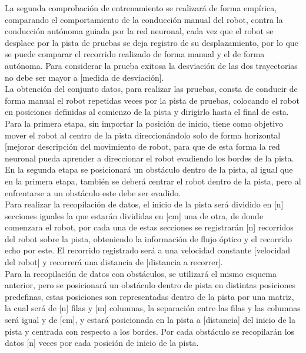 \documentclass{iccmemoria}
\begin{document}
La segunda comprobación de entrenamiento se realizará de forma empírica, comparando el comportamiento de la conducción manual del robot, contra la conducción autónoma guiada por la red neuronal, cada vez que el robot se desplace por la pista de pruebas se deja registro de su desplazamiento, por lo que se puede comparar el recorrido realizado de forma manual y el de forma autónoma. Para considerar la prueba exitosa la desviación de las dos trayectorias no debe ser mayor a [medida de desviación].\\

La obtención del conjunto datos, para realizar las pruebas, consta de conducir de forma manual el robot repetidas veces por la pista de pruebas, colocando el robot en posiciones definidas al comienzo de la pista y dirigirlo hasta el final de esta.\\

Para la primera etapa, sin importar la posición de inicio, tiene como objetivo mover el robot al centro de la pista direccionándolo solo de forma horizontal [mejorar descripción del movimiento de robot, para que de esta forma la red neuronal pueda aprender a direccionar el robot evadiendo los bordes de la pista.\\

En la segunda etapa se posicionará un obstáculo dentro de la pista, al igual que en la primera etapa, también se deberá centrar el robot dentro de la pista, pero al enfrentarse a un obstáculo este debe ser evadido.\\

Para realizar la recopilación de datos, el inicio de la pista será dividido en [n] secciones iguales la que estarán divididas en [cm] una de otra, de donde comenzara el robot, por cada una de estas secciones se registrarán [n] recorridos del robot sobre la pista, obteniendo la información de flujo óptico y el recorrido echo por este. El recorrido registrado será a una velocidad constante [velocidad del robot] y recorrerá una distancia de [distancia a recorrer].\\

Para la recopilación de datos con obstáculos, se utilizará el mismo esquema anterior, pero se posicionará un obstáculo dentro de pista en distintas posiciones predefinas, estas posiciones son representadas dentro de la pista por una matriz, la cual será de [n] filas y [m] columnas, la separación entre las filas y las columnas será igual y de [cm], y estará posicionada en la pista a [distancia] del inicio de la pista y centrada con respecto a los bordes. Por cada obstáculo se recopilarán los datos [n] veces por cada posición de inicio de la pista.\\
\end{document}
